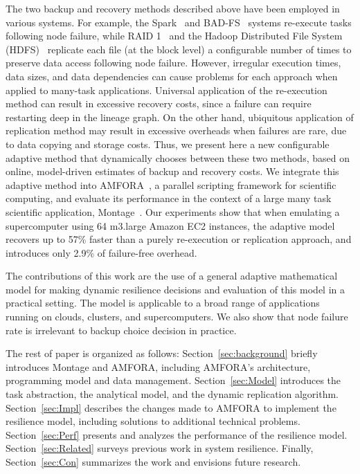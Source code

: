 \documentclass{sig-alternate}
\newcommand{\zhaonote}[1]{{\textcolor{cyan}    { ***Zhao:      #1 }}}
\newcommand{\kylenote}[1]{{\textcolor{orange}    { ***Kyle:      #1 }}}
\newcommand{\zhaonote}[1]{}
\newcommand{\kylenote}[1]{}
\begin{document}
The two backup and recovery methods described above have been employed in various systems. For example,
the Spark~\cite{RDD2012} and BAD-FS~\cite{badfs2004} systems re-execute tasks following node failure,
while RAID 1~\cite{raid1988} and the Hadoop Distributed File System (HDFS)~\cite{HDFS} replicate each file (at the block level) a configurable number of times to preserve data access following node failure.
However, irregular execution times, data sizes, and data dependencies can cause problems for each approach when applied to many-task applications. 
Universal application of the re-execution method can result in excessive recovery costs, since a failure can 
require restarting deep in the lineage graph.
On the other hand, ubiquitous application of replication method may result in excessive overheads when failures are rare, due to data copying and storage costs.
Thus, we present here a new configurable adaptive method that dynamically chooses between these two methods,
based on online, model-driven estimates of backup and recovery costs. We integrate this adaptive method into
AMFORA~\cite{AME, AMFS2013},
a parallel scripting framework for scientific computing, and evaluate its performance in the context of a large many task scientific application, Montage~\cite{montage2, montage1}. 
Our experiments show that when emulating a supercomputer using 64 m3.large Amazon EC2 instances, the adaptive model recovers up to 57\% faster than a purely re-execution or replication approach, and introduces only 2.9\% of failure-free overhead. %

The contributions of this work are the use of a general adaptive mathematical model for making dynamic resilience %
decisions and evaluation of this model in a practical setting.
The model is applicable to a broad range of applications running on clouds, clusters, and supercomputers. We also show that node failure rate is irrelevant to backup choice decision in practice.

The rest of paper is organized as follows:
Section~\ref{sec:background} briefly introduces Montage and AMFORA, including AMFORA's architecture, programming model and data management.
Section~\ref{sec:Model} introduces the task abstraction, the analytical model, and the dynamic replication algorithm. 
Section~\ref{sec:Impl} describes the changes made to AMFORA 
to implement the resilience model, including solutions to additional technical problems. 
Section~\ref{sec:Perf} presents and analyzes the performance of the resilience model.  
Section~\ref{sec:Related} surveys previous work in system resilience.
Finally, Section~\ref{sec:Con} summarizes the work and envisions future research.
\end{document}
